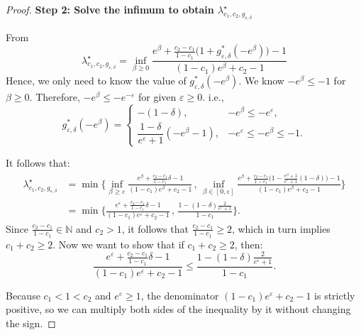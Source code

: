 \documentclass[accepted]{article}
\theoremstyle{plain} %
\theoremstyle{definition}
\theoremstyle{remark}
\newcommand{\eps}{\varepsilon}
\begin{document}
\begin{proof}
\textbf{Step 2: Solve the infimum to obtain $\lambda^\star_{c_1,c_2,g_{\varepsilon,\delta}}$}

 From   \[
    \lambda^\star_{c_1,c_2,g_{\varepsilon,\delta}} 
    = \inf_{\beta \geq 0} 
    \frac{e^\beta + \frac{c_2 - c_1}{1 - c_1} \big( 1 + g_{\eps,\delta}^*(-e^\beta) \big) - 1}
         {(1 - c_1)e^\beta + c_2 - 1}
    \] 
    Hence, we only need to know the value of $g_{\eps,\delta}^*(-e^\beta )$. We know $-e^{\beta} \le -1$ for $\beta \geq 0$. Therefore, $-e^{\beta} \leq - e^{-\eps}$ for given $\eps \geq 0$. i.e.,
    \[g_{\varepsilon,\delta}^{*}(-e^\beta) = \begin{cases}
        -(1-\delta), &  -e^\beta \le -e^\eps,\\[6pt]
        \dfrac{1-\delta}{e^{\varepsilon}+1}(-e^\beta-1), & -e^\eps \le -e^\beta \leq -1.
        
    \end{cases}\]
    



It follows that:
\begin{align*}\lambda^\star_{c_1,c_2,g_{\varepsilon,\delta}} & =  
         \min\Bigg\{ \inf_{\beta \geq \eps} 
    \frac{e^\beta + \frac{c_2 - c_1}{1 - c_1}  \delta  - 1}
         {(1 - c_1)e^\beta + c_2 - 1} \, , \, \inf_{\beta \in [0,\eps]} 
    \frac{e^\beta + \frac{c_2 - c_1}{1 - c_1} \bigg( 1 - \frac{e^\beta+1}{e^{\varepsilon}+1}(1 - \delta) \bigg) - 1}
         {(1 - c_1)e^\beta + c_2 - 1}\Bigg\} \\
         & = \min\bigg\{\frac{e^\eps + \frac{c_2 - c_1}{1 - c_1}\delta - 1}{(1 - c_1)e^\eps + c_2 - 1} \, , \, \frac{1 - (1-\delta)\frac{2}{e^\eps + 1}}{1 - c_1}\bigg\}.
\end{align*}
Since $\frac{c_2 - c_1}{1 - c_1} \in \mathbb{N}$ and $c_2 > 1$, it follows that $\frac{c_2 - c_1}{1 - c_1} \geq 2$, which in turn implies  $c_1 + c_2 \geq 2$. Now we want to show that if $c_1 + c_2 \geq 2$, then:
\[\frac{e^\eps + \frac{c_2 - c_1}{1 - c_1}\delta - 1}{(1 - c_1)e^\eps + c_2 - 1} \leq \frac{1 - (1-\delta)\frac{2}{e^\eps + 1}}{1 - c_1}.\]

Because $c_1 < 1 < c_2$ and $e^\varepsilon \ge 1$, the denominator
\(
(1-c_1)e^\varepsilon + c_2 - 1
\)
is strictly positive, so we can multiply both sides of the
inequality by it without changing the sign.


\end{proof}
\end{document}
